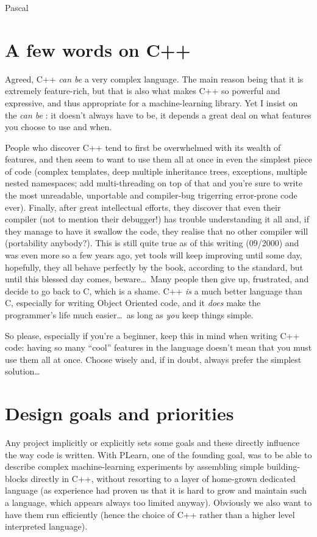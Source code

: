 \documentclass[11pt]{book}
\begin{document}
 Pascal 

\section{A few words on C++}
 Agreed, C++ \emph{can be} a very complex language. The main reason
being that it is extremely feature-rich, but that is also what
makes C++ so powerful and expressive, and thus appropriate for a
machine-learning library. Yet I insist on the \emph{can be} : it
doesn't always have to be, it depends a great deal on what features
you choose to use and when.

 People who discover C++ tend to first be overwhelmed with its wealth
of features, and then seem to want to use them all at once in even the
simplest piece of code (complex templates, deep multiple inheritance
trees, exceptions, multiple nested namespaces; add multi-threading on
top of that and you're sure to write the most unreadable, unportable
and compiler-bug trigerring error-prone code ever). Finally, after
great intellectual efforts, they discover that even their compiler
(not to mention their debugger!) has trouble understanding it all
and, if they manage to have it swallow the code, they realise that
no other compiler will (portability anybody?). This is still quite
true as of this writing (09/2000) and was even more so a few years
ago, yet tools will keep improving until some day, hopefully, they
all behave perfectly by the book, according to the standard, but
until this blessed day comes, beware\ldots\ Many people then give up,
frustrated, and decide to go back to C, which is a shame. C++ \emph{is}
a much better language than C, especially for writing Object Oriented
code, and it \emph{does} make the programmer's life much easier\ldots\
as long as \emph{you} keep things simple.


 So please, especially if you're a beginner, keep this in mind
when writing C++ code: having so many ``cool'' features in the language
doesn't mean that you must use them all at once. Choose wisely and,
if in doubt, always prefer the simplest solution\ldots

\section{Design goals and priorities}

 Any project implicitly or explicitly sets some goals and these
directly influence the way code is written. With PLearn, one of the
founding goal, was to be able to describe complex machine-learning
experiments by assembling simple building-blocks directly in C++,
without resorting to a layer of home-grown dedicated language (as
experience had proven us that it is hard to grow and maintain such
a language, which appears always too limited anyway). Obviously
we also want to have them run efficiently (hence the choice of C++
rather than a higher level interpreted language).
\end{document}
